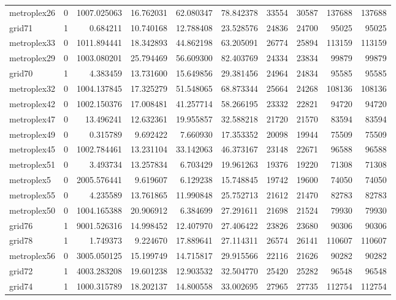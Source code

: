 \begin{longtable}{|l|r|r|r|r|r|r|r|r|r|}
metroplex26 & 0 & 1007.025063 & 16.762031 & 62.080347 & 78.842378 & 33554 & 30587 & 137688 & 137688 \\
grid71 & 1 & 0.684211 & 10.740168 & 12.788408 & 23.528576 & 24836 & 24700 & 95025 & 95025 \\
metroplex33 & 0 & 1011.894441 & 18.342893 & 44.862198 & 63.205091 & 26774 & 25894 & 113159 & 113159 \\
metroplex29 & 0 & 1003.080201 & 25.794469 & 56.609300 & 82.403769 & 24334 & 23834 & 99879 & 99879 \\
grid70 & 1 & 4.383459 & 13.731600 & 15.649856 & 29.381456 & 24964 & 24834 & 95585 & 95585 \\
metroplex32 & 0 & 1004.137845 & 17.325279 & 51.548065 & 68.873344 & 25664 & 24268 & 108136 & 108136 \\
metroplex42 & 0 & 1002.150376 & 17.008481 & 41.257714 & 58.266195 & 23332 & 22821 & 94720 & 94720 \\
metroplex47 & 0 & 13.496241 & 12.632361 & 19.955857 & 32.588218 & 21720 & 21570 & 83594 & 83594 \\
metroplex49 & 0 & 0.315789 & 9.692422 & 7.660930 & 17.353352 & 20098 & 19944 & 75509 & 75509 \\
metroplex45 & 0 & 1002.784461 & 13.231104 & 33.142063 & 46.373167 & 23148 & 22671 & 96588 & 96588 \\
metroplex51 & 0 & 3.493734 & 13.257834 & 6.703429 & 19.961263 & 19376 & 19220 & 71308 & 71308 \\
metroplex5 & 0 & 2005.576441 & 9.619607 & 6.129238 & 15.748845 & 19742 & 19600 & 74050 & 74050 \\
metroplex55 & 0 & 4.235589 & 13.761865 & 11.990848 & 25.752713 & 21612 & 21470 & 82783 & 82783 \\
metroplex50 & 0 & 1004.165388 & 20.906912 & 6.384699 & 27.291611 & 21698 & 21524 & 79930 & 79930 \\
grid76 & 1 & 9001.526316 & 14.998452 & 12.407970 & 27.406422 & 23826 & 23680 & 90306 & 90306 \\
grid78 & 1 & 1.749373 & 9.224670 & 17.889641 & 27.114311 & 26574 & 26141 & 110607 & 110607 \\
metroplex56 & 0 & 3005.050125 & 15.199749 & 14.715817 & 29.915566 & 22116 & 21626 & 90282 & 90282 \\
grid72 & 1 & 4003.283208 & 19.601238 & 12.903532 & 32.504770 & 25420 & 25282 & 96548 & 96548 \\
grid74 & 1 & 1000.315789 & 18.202137 & 14.800558 & 33.002695 & 27965 & 27735 & 112754 & 112754 \\

\end{longtable}
